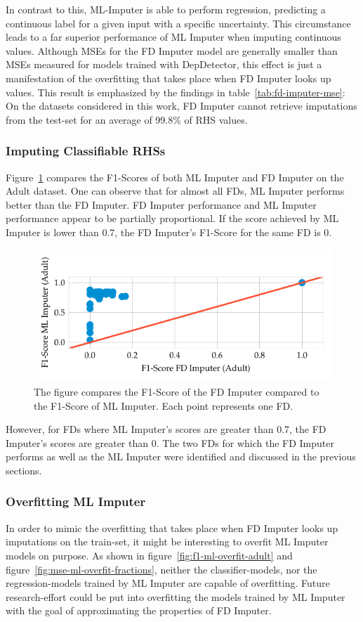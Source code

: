 In contrast to this, ML-Imputer is able to perform regression, predicting a continuous label for a given input with a specific uncertainty.
This circumstance leads to a far superior performance of ML Imputer when imputing continuous values.
Although MSEs for the FD Imputer model are generally smaller than MSEs measured for models trained with DepDetector, this effect is just a manifestation of the overfitting that takes place when FD Imputer looks up values.
This result is emphasized by the findings in table~\ref{tab:fd-imputer-mse}:
On the datasets considered in this work, FD Imputer cannot retrieve imputations from the test-set for an average of 99.8\% of RHS values.

\subsubsection{Imputing Classifiable RHSs}
Figure~\ref{fig:f1_ml_fd_adult} compares the F1-Scores of both ML Imputer and FD Imputer on the Adult dataset.
One can observe that for almost all FDs, ML Imputer performs better than the FD Imputer.
FD Imputer performance and ML Imputer performance appear to be partially proportional.
If the score achieved by ML Imputer is lower than 0.7, the FD Imputer's F1-Score for the same FD is 0.
\begin{figure}[ht]
     \centering
     \includegraphics[width=\textwidth]{../figures/adult/f1_ml_fd}
     \caption{The figure compares the F1-Score of the FD Imputer compared to the F1-Score of ML Imputer. Each point represents one FD.}
     \label{fig:f1_ml_fd_adult}
 \end{figure}

However, for FDs where ML Imputer's scores are greater than 0.7, the FD Imputer's scores are greater than 0.
The two FDs for which the FD Imputer performs as well as the ML Imputer were identified and discussed in the previous sections.

\subsubsection{Overfitting ML Imputer}
In order to mimic the overfitting that takes place when FD Imputer looks up imputations on the train-set, it might be interesting to overfit ML Imputer models on purpose.
As shown in figure~\ref{fig:f1-ml-overfit-adult} and figure~\ref{fig:mse-ml-overfit-fractions}, neither the classifier-models, nor the regression-models trained by ML Imputer are capable of overfitting.
Future research-effort could be put into overfitting the models trained by ML Imputer with the goal of approximating the properties of FD Imputer.

